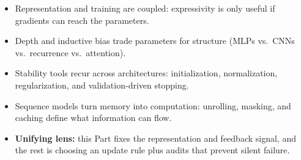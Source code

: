 









\begin{tcolorbox}[summarybox, title={Part II takeaways}]
\begin{itemize}
  \item Representation and training are coupled: expressivity is only useful if gradients can reach the parameters.
  \item Depth and inductive bias trade parameters for structure (MLPs vs.\ CNNs vs.\ recurrence vs.\ attention).
  \item Stability tools recur across architectures: initialization, normalization, regularization, and validation-driven stopping.
  \item Sequence models turn memory into computation: unrolling, masking, and caching define what information can flow.
  \item \textbf{Unifying lens:} this Part fixes the representation and feedback signal, and the rest is choosing an update rule plus audits that prevent silent failure.
\end{itemize}
\end{tcolorbox}
